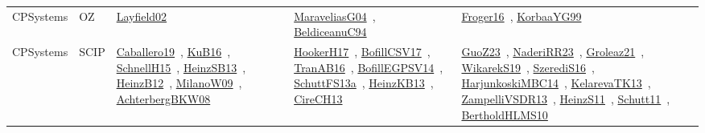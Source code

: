{\begin{longtable}{lp{3cm}>{\raggedright\arraybackslash}p{6cm}>{\raggedright\arraybackslash}p{6cm}>{\raggedright\arraybackslash}p{8cm}}
CPSystems & OZ & \href{../works/Layfield02.pdf}{Layfield02}~\cite{Layfield02} & \href{../works/MaraveliasG04.pdf}{MaraveliasG04}~\cite{MaraveliasG04}, \href{../works/BeldiceanuC94.pdf}{BeldiceanuC94}~\cite{BeldiceanuC94} & \href{../works/Froger16.pdf}{Froger16}~\cite{Froger16}, \href{../works/KorbaaYG99.pdf}{KorbaaYG99}~\cite{KorbaaYG99}\\
CPSystems & SCIP & \href{../works/Caballero19.pdf}{Caballero19}~\cite{Caballero19}, \href{../works/KuB16.pdf}{KuB16}~\cite{KuB16}, \href{../works/SchnellH15.pdf}{SchnellH15}~\cite{SchnellH15}, \href{../works/HeinzSB13.pdf}{HeinzSB13}~\cite{HeinzSB13}, \href{../works/HeinzB12.pdf}{HeinzB12}~\cite{HeinzB12}, \href{../works/MilanoW09.pdf}{MilanoW09}~\cite{MilanoW09}, \href{../works/AchterbergBKW08.pdf}{AchterbergBKW08}~\cite{AchterbergBKW08} & \href{../works/HookerH17.pdf}{HookerH17}~\cite{HookerH17}, \href{../works/BofillCSV17.pdf}{BofillCSV17}~\cite{BofillCSV17}, \href{../works/TranAB16.pdf}{TranAB16}~\cite{TranAB16}, \href{../works/BofillEGPSV14.pdf}{BofillEGPSV14}~\cite{BofillEGPSV14}, \href{../works/SchuttFS13a.pdf}{SchuttFS13a}~\cite{SchuttFS13a}, \href{../works/HeinzKB13.pdf}{HeinzKB13}~\cite{HeinzKB13}, \href{../works/CireCH13.pdf}{CireCH13}~\cite{CireCH13} & \href{../works/GuoZ23.pdf}{GuoZ23}~\cite{GuoZ23}, \href{../works/NaderiRR23.pdf}{NaderiRR23}~\cite{NaderiRR23}, \href{../works/Groleaz21.pdf}{Groleaz21}~\cite{Groleaz21}, \href{../works/WikarekS19.pdf}{WikarekS19}~\cite{WikarekS19}, \href{../works/SzerediS16.pdf}{SzerediS16}~\cite{SzerediS16}, \href{../works/HarjunkoskiMBC14.pdf}{HarjunkoskiMBC14}~\cite{HarjunkoskiMBC14}, \href{../works/KelarevaTK13.pdf}{KelarevaTK13}~\cite{KelarevaTK13}, \href{../works/ZampelliVSDR13.pdf}{ZampelliVSDR13}~\cite{ZampelliVSDR13}, \href{../works/HeinzS11.pdf}{HeinzS11}~\cite{HeinzS11}, \href{../works/Schutt11.pdf}{Schutt11}~\cite{Schutt11}, \href{../works/BertholdHLMS10.pdf}{BertholdHLMS10}~\cite{BertholdHLMS10}\\

\end{longtable}}
